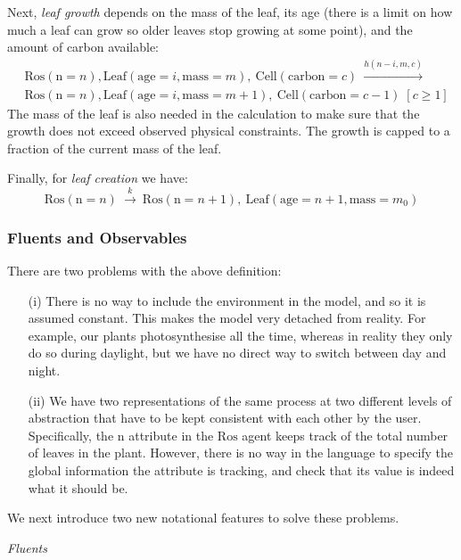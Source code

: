 \documentclass[phd]{infthesis}
\begin{document}
Next, \textit{leaf growth} depends on the mass of the leaf, its age (there is a
limit on how much a leaf can grow so older leaves stop growing at some point),
and the amount of carbon available:
%
\begin{align*}
  & \mathrm{Ros}(\mathrm{n}=n), \mathrm{Leaf}(\mathrm{age}=i,
\mathrm{mass}=m),\: \mathrm{Cell}(\mathrm{carbon}=c) \: \xrightarrow{h(n-i, m,
    c)}\: \\
  & \mathrm{Ros}(\mathrm{n} =n), \mathrm{Leaf}(\mathrm{age}=i,
\mathrm{mass}=m+1),\: \mathrm{Cell}(\mathrm{carbon}=c-1) \; [c \geq 1]
\end{align*} The mass of the leaf is also needed in the calculation to make sure
that the growth does not exceed observed physical constraints. The growth is
capped to a fraction of the current mass of the leaf.

Finally, for \textit{leaf creation} we have:
\begin{equation*} \mathrm{Ros}(\mathrm{n}=n) \: \xrightarrow{k} \:
\mathrm{Ros}(\mathrm{n}=n+1), \: \mathrm{Leaf}(\mathrm{age}=n+1,
\mathrm{mass}=m_0)
\end{equation*}

\subsubsection*{Fluents and Observables}
There are two problems with the above definition: 
\begin{itemize}
\item[(i)] There is no way to include the environment in the model, and so it is
  assumed constant. This makes the model very detached from reality.  For
  example, our plants photosynthesise all the time, whereas in reality they only
  do so during daylight, but we have no direct way to switch between day and
  night.
\item[(ii)] We have two representations of the same process at two different
  levels of abstraction that have to be kept consistent with each other by the
  user.  Specifically, the $\mathrm{n}$ attribute in the $\mathrm{Ros}$ agent
  keeps track of the total number of leaves in the plant. However, there is no
  way in the language to specify the global information the attribute is
  tracking, and check that its value is indeed what it should be.
\end{itemize}

We next introduce two new notational features
to solve these problems.

\textit{Fluents}
\end{document}
